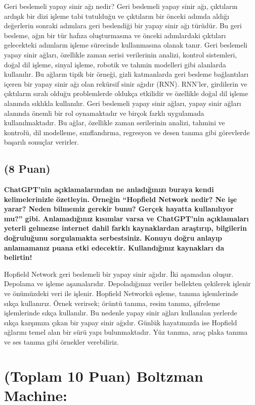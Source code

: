 \documentclass[11pt]{article}
\begin{document}
Geri beslemeli yapay sinir ağı nedir?
Geri beslemeli yapay sinir ağı, çıktıların ardışık bir dizi işleme tabi tutulduğu ve çıktıların bir önceki adımda aldığı değerlerin sonraki adımlara geri beslendiği bir yapay sinir ağı türüdür. Bu geri besleme, ağın bir tür hafıza oluşturmasına ve önceki adımlardaki çıktıları gelecekteki adımların işleme sürecinde kullanmasına olanak tanır.
Geri beslemeli yapay sinir ağları, özellikle zaman serisi verilerinin analizi, kontrol sistemleri, doğal dil işleme, sinyal işleme, robotik ve tahmin modelleri gibi alanlarda kullanılır. Bu ağların tipik bir örneği, gizli katmanlarda geri besleme bağlantıları içeren bir yapay sinir ağı olan rekürsif sinir ağıdır (RNN). RNN'ler, girdilerin ve çıktıların sıralı olduğu problemlerde oldukça etkilidir ve özellikle doğal dil işleme alanında sıklıkla kullanılır.
Geri beslemeli yapay sinir ağları, yapay sinir ağları alanında önemli bir rol oynamaktadır ve birçok farklı uygulamada kullanılmaktadır. Bu ağlar, özellikle zaman serilerinin analizi, tahmini ve kontrolü, dil modelleme, sınıflandırma, regresyon ve desen tanıma gibi görevlerde başarılı sonuçlar verirler.


\subsection{(8 Puan)} \textbf{ChatGPT’nin açıklamalarından ne anladığınızı buraya kendi kelimelerinizle özetleyin. Örneğin ``Hopfield Network nedir? Ne işe yarar? Neden bilmemiz gerekir bunu? Gerçek hayatta kullanılıyor mu?'' gibi. Anlamadığınız kısımlar varsa ve ChatGPT’nin açıklamaları yeterli gelmezse internet dahil farklı kaynaklardan araştırıp, bilgilerin doğruluğunu sorgulamakta serbestsiniz. Konuyu doğru anlayıp anlamamanız puana etki edecektir. Kullandığınız kaynakları da belirtin!}

Hopfield Network geri beslemeli bir yapay sinir ağıdır. İki aşamadan oluşur. Depolama ve işleme aşamalarıdır. Depoladığımız veriler bellekten çekilerek işlenir ve önümüzdeki veri ile işlenir. Hopfield Networkü eşleme, tanıma işlemlerinde sıkça kullanırız. Örnek verirsek; örüntü tanıma, resim tanıma, şifreleme işlemlerinde sıkça kullanılır. Bu nedenle yapay sinir ağları kullanılan yerlerde sıkça karşımıza çıkan bir yapay sinir ağıdır. Günlük hayatımızda ise Hopfield ağlarını temel alan bir sürü yapı bulunmaktadır. Yüz tanıma, araç plaka tanıma ve ses tanıma gibi örnekler verebiliriz.

\section{(Toplam 10 Puan) Boltzman Machine:}
\end{document}
